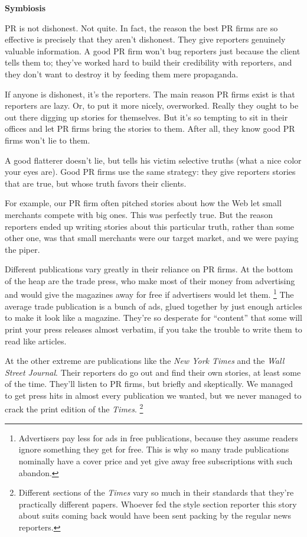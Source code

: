 \textbf{Symbiosis}

PR is not dishonest. Not quite. In fact, the reason the best PR firms
are so effective is precisely that they aren't dishonest. They give
reporters genuinely valuable information. A good PR firm won't bug
reporters just because the client tells them to; they've worked hard to
build their credibility with reporters, and they don't want to destroy
it by feeding them mere propaganda.

If anyone is dishonest, it's the reporters. The main reason PR firms
exist is that reporters are lazy. Or, to put it more nicely, overworked.
Really they ought to be out there digging up stories for themselves. But
it's so tempting to sit in their offices and let PR firms bring the
stories to them. After all, they know good PR firms won't lie to them.

A good flatterer doesn't lie, but tells his victim selective truths
(what a nice color your eyes are). Good PR firms use the same strategy:
they give reporters stories that are true, but whose truth favors their
clients.

For example, our PR firm often pitched stories about how the Web let
small merchants compete with big ones. This was perfectly true. But the
reason reporters ended up writing stories about this particular truth,
rather than some other one, was that small merchants were our target
market, and we were paying the piper.

Different publications vary greatly in their reliance on PR firms. At
the bottom of the heap are the trade press, who make most of their money
from advertising and would give the magazines away for free if
advertisers would let them. \footnote{Advertisers pay less for ads in free publications, because they
assume readers ignore something they get for free. This is why so many
trade publications nominally have a cover price and yet give away free
subscriptions with such abandon.} The average trade
publication is a bunch of ads, glued together by just enough articles to
make it look like a magazine. They're so desperate for ``content'' that
some will print your press releases almost verbatim, if you take the
trouble to write them to read like articles.

At the other extreme are publications like the \emph{New York Times} and
the \emph{Wall Street Journal}. Their reporters do go out and find their
own stories, at least some of the time. They'll listen to PR firms, but
briefly and skeptically. We managed to get press hits in almost every
publication we wanted, but we never managed to crack the print edition
of the \emph{Times}. \footnote{Different sections of the \emph{Times} vary so much in their
standards that they're practically different papers. Whoever fed the
style section reporter this story about suits coming back would have
been sent packing by the regular news reporters.}

